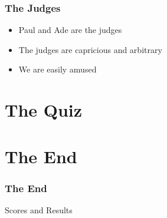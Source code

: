 \documentclass[t,compress,aspectratio=169]{beamer}
\begin{document}
\begin{frame}
    \frametitle{The Judges}
    \begin{itemize}
        \item Paul and Ade are the judges
        \item The judges are capricious and arbitrary
        \item We are easily amused
    \end{itemize}
\end{frame}


\section*{The Quiz}








\section*{The End}
\begin{frame}
    \frametitle{The End}
    \vspace{0.3cm}
    \begin{block}{}
        \centering\begin{Huge}Scores and Results\end{Huge}
    \end{block}
\end{frame}


% 
% 
\end{document}
